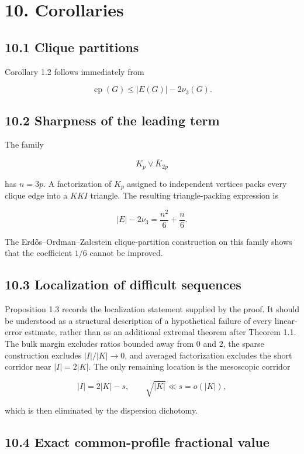 \documentclass[
  11pt,
]{article}
\begin{document}
\section{10. Corollaries}\label{corollaries}

\subsection{10.1 Clique partitions}\label{clique-partitions}

Corollary 1.2 follows immediately from

\[
\operatorname{cp}(G)
\le
|E(G)|-2\nu_3(G).
\]

\subsection{10.2 Sharpness of the leading
term}\label{sharpness-of-the-leading-term}

The family

\[
K_p\vee\overline K_{2p}
\]

has \(n=3p\). A factorization of \(K_p\) assigned to independent
vertices packs every clique edge into a \(KKI\) triangle. The resulting
triangle-packing expression is

\[
|E|-2\nu_3
=
\frac{n^2}{6}+\frac n6.
\tag{10.1}
\]

The Erdős--Ordman--Zalcstein clique-partition construction on this
family shows that the coefficient \(1/6\) cannot be improved.

\subsection{10.3 Localization of difficult
sequences}\label{localization-of-difficult-sequences}

Proposition 1.3 records the localization statement supplied by the
proof. It should be understood as a structural description of a
hypothetical failure of every linear-error estimate, rather than as an
additional extremal theorem after Theorem 1.1. The bulk margin excludes
ratios bounded away from \(0\) and \(2\), the sparse construction
excludes \(|I|/|K|\to0\), and averaged factorization excludes the short
corridor near \(|I|=2|K|\). The only remaining location is the
mesoscopic corridor

\[
|I|=2|K|-s,
\qquad
\sqrt{|K|}\ll s=o(|K|),
\]

which is then eliminated by the dispersion dichotomy.

\subsection{10.4 Exact common-profile fractional
value}\label{exact-common-profile-fractional-value}
\end{document}
